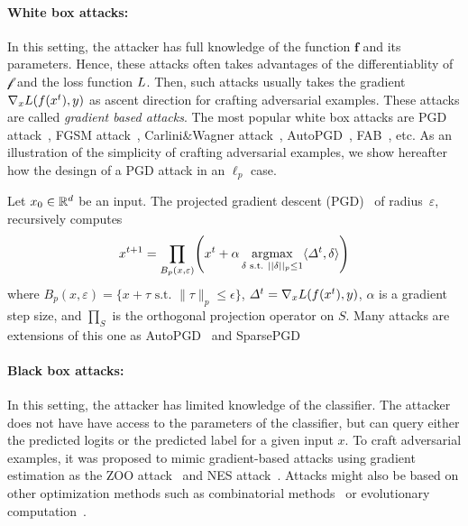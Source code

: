 \paragraph{White box attacks:} In this setting, the attacker has  full knowledge of the function $\mathbf{f}$ and its parameters. Hence, these attacks often takes advantages of the differentiablity of $\mathcal{f}$ and the loss function $L$. Then, such attacks usually takes the gradient $\nabla_x \loss\left(f\left(x^t\right),y\right)$ as ascent direction for crafting adversarial examples.  These attacks are called \emph{gradient based attacks}. The most popular white box attacks are PGD attack~\cite{kurakin2016adversarial,madry2018towards}, FGSM attack~\citep{goodfellow2014explaining}, Carlini\&Wagner attack~\citep{carlini2017towards}, AutoPGD~\citep{Croce2020MinimallyDA}, FAB~\citep{Croce2020MinimallyDA}, etc. As an illustration of the simplicity of crafting adversarial examples, we show hereafter how the desingn of a PGD attack in an $\ell_p$ case.
\begin{example*} Let $x_0\in\mathbb{R}^d$ be an input. The projected gradient descent (PGD)~\cite{kurakin2016adversarial,madry2018towards} of radius~$\varepsilon$, recursively computes
\begin{align*}
x^{t+1}=\prod_{B_p(x,\varepsilon)}\left(x^t
+\alpha \argmaxB_{\delta\text{ s.t. }||\delta||_p\leq1} \langle\Delta^t,\delta \rangle\right)
\end{align*}
where $B_p(x,\varepsilon) = \{ x+\tau \text{~s.t.~} \lVert\tau\rVert_p \leq \epsilon\}$, $\Delta^t=\nabla_x \loss\left(f\left(x^t\right),y\right)$, $\alpha$ is a gradient step size, and $\prod_S$ is the orthogonal projection operator on $S$. Many attacks are extensions of this one as AutoPGD~\citep{croce2020reliable} and SparsePGD~\citep{tramer2019adversarial}
\end{example*}
\paragraph{Black box attacks:} In this setting, the attacker has limited knowledge of the classifier. The attacker does not have have access to the parameters of the classifier, but can query either the predicted logits or the predicted label for a given input $x$. To craft adversarial examples, it was proposed to mimic gradient-based attacks using gradient estimation as the ZOO attack~\citep{chen2017zoo} and NES attack~\citep{ilyas2018black,ilyas2019adversarial}. Attacks might also be based on other optimization methods such as combinatorial methods~\citep{moon19aparsimonous} or evolutionary computation~\citep{andriushchenko2019square}.










